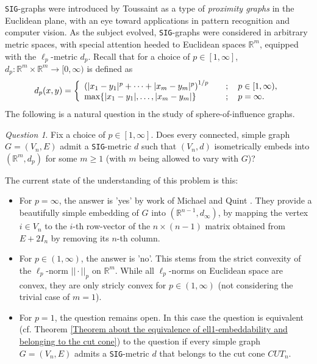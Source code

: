 \documentclass[12pt]{amsart}
\numberwithin{theorem}{section}
\theoremstyle{remark}
\newtheorem{question}{Question}
\newcommand{\sig}{{\tt SIG }}
\newcommand{\sigg}{{\tt SIG}}
\begin{document}
\sigg-graphs were introduced by Toussaint \cite{Toussaint1, Toussaint2, Toussaint3} as a type of {\em proximity graphs} in the Euclidean plane, with an eye toward applications in pattern recognition and computer vision. %
As the subject evolved, \sigg-graphs were considered in arbitrary metric spaces, with special attention heeded to Euclidean spaces $\mathbb R^m$, equipped with the $\ell_p$-metric $d_p$. Recall that for a choice of $p\in [1,\infty]$, $d_p:\mathbb R^m\times \mathbb R^m\to [0,\infty)$ is defined  as 
$$
d_p(x,y) = \left\{  
\begin{array}{ll}
	\left(|x_1-y_1|^p+ \dots+ |x_m-y_m|^p   \right)^{1/p} & \quad ; \quad p\in [1,\infty), \cr 	
	\max\{|x_1-y_1|, \dots, |x_m-y_m|\} & \quad ; \quad p=\infty. 
\end{array} 
\right. 
$$
The following is a natural question in the study of sphere-of-influence graphs. 
\begin{question} \label{Question about L1-embeddability of simple graphs, as stated in the introduction}
Fix a choice of $p\in [1,\infty]$. Does every connected, simple graph $G=(V_n,E)$ admit a \sigg-metric $d$ such that $(V_n,d)$ isometrically embeds into $(\mathbb R^m, d_p)$ for some $m\ge 1$ (with $m$ being allowed to vary with $G$)? 
\end{question}
The current state of the understanding of this problem is this: 
\begin{itemize}
\item[1.] For $p=\infty$, the answer is 'yes'  by work of Michael and Quint \cite{MichaelQuint1}. They provide a beautifully simple embedding of $G$ into $(\mathbb R^{n-1}, d_\infty)$, by mapping the vertex $i\in V_n$ to the $i$-th row-vector of the $n\times (n-1)$ matrix obtained from $E+2I_n$ by removing its $n$-th column.
\item[2.] For $p\in (1,\infty)$, the answer is 'no'. This stems from the strict convexity of the $\ell_p$-norm $||\cdot||_p$ on $\mathbb R^m$. While all $\ell_p$-norms on Euclidean space are convex, they are only stricly convex for $p\in (1,\infty)$ (not considering the trivial case of $m=1$).  
\item[3.] For $p=1$, the question remains open. In this case the question is equivalent (cf. Theorem \ref{Theorem about the equivalence of ell1-embeddability and belonging to the cut cone}) to the question if every simple graph $G=(V_n,E)$ admits a \sigg-metric $d$ that belongs to the cut cone $CUT_n$. 
\end{itemize}
\end{document}
